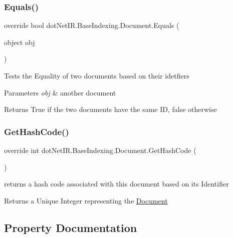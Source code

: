 \subsubsection{\texorpdfstring{Equals()}{Equals()}}
{\footnotesize\ttfamily override bool dot\+Net\+I\+R.\+Base\+Indexing.\+Document.\+Equals (\begin{DoxyParamCaption}\item[{object}]{obj }\end{DoxyParamCaption})}



Tests the Equality of two documents based on their idetfiers 


\begin{DoxyParams}{Parameters}
{\em obj} & another document\\
\hline
\end{DoxyParams}
\begin{DoxyReturn}{Returns}
True if the two documents have the same ID, false otherwise
\end{DoxyReturn}
\hypertarget{classdot_net_i_r_1_1_base_indexing_1_1_document_a12b172751bdbb782c557fabc2a6b9ecb}{}\label{classdot_net_i_r_1_1_base_indexing_1_1_document_a12b172751bdbb782c557fabc2a6b9ecb} 
\subsubsection{\texorpdfstring{Get\+Hash\+Code()}{GetHashCode()}}
{\footnotesize\ttfamily override int dot\+Net\+I\+R.\+Base\+Indexing.\+Document.\+Get\+Hash\+Code (\begin{DoxyParamCaption}{ }\end{DoxyParamCaption})}



returns a hash code associated with this document based on its Identifier 

\begin{DoxyReturn}{Returns}
a Unique Integer representing the \hyperlink{classdot_net_i_r_1_1_base_indexing_1_1_document}{Document}
\end{DoxyReturn}


\subsection{Property Documentation}
\hypertarget{classdot_net_i_r_1_1_base_indexing_1_1_document_a80e92b6ffc89897c1dd53cb491eaf30b}{}\label{classdot_net_i_r_1_1_base_indexing_1_1_document_a80e92b6ffc89897c1dd53cb491eaf30b} 
